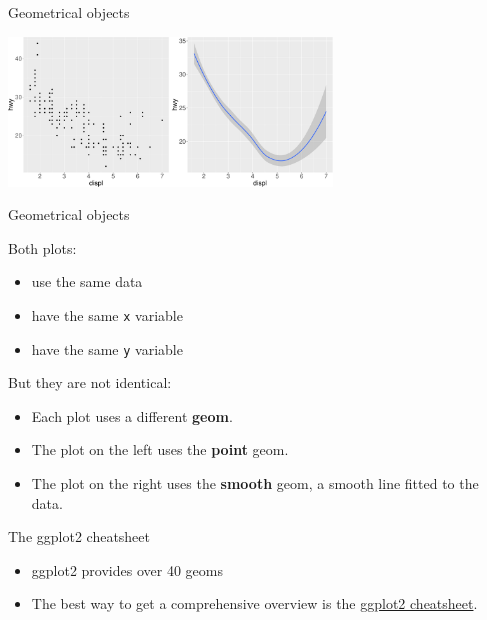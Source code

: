 \documentclass[ignorenonframetext,]{beamer}
\providecommand{\tightlist}{%
  \setlength{\itemsep}{0pt}\setlength{\parskip}{0pt}}
\begin{document}
\begin{frame}{Geometrical objects}
\protect\hypertarget{geometrical-objects-2}{}

\begin{center}\includegraphics[height=150px]{data-visualization_files/figure-beamer/unnamed-chunk-6-1} \end{center}

\end{frame}

\begin{frame}[fragile]{Geometrical objects}
\protect\hypertarget{geometrical-objects-3}{}

Both plots:

\begin{itemize}
\item
  use the same data
\item
  have the same \texttt{x} variable
\item
  have the same \texttt{y} variable
\end{itemize}

But they are not identical:

\begin{itemize}
\item
  Each plot uses a different \textbf{geom}.
\item
  The plot on the left uses the \textbf{point} geom.
\item
  The plot on the right uses the \textbf{smooth} geom, a smooth line
  fitted to the data.
\end{itemize}

\end{frame}

\begin{frame}{The ggplot2 cheatsheet}
\protect\hypertarget{the-ggplot2-cheatsheet}{}

\begin{itemize}
\tightlist
\item
  ggplot2 provides over 40 geoms
\item
  The best way to get a comprehensive overview is the
  \href{https://rstudio.com/wp-content/uploads/2016/11/ggplot2-cheatsheet-2.1.pdf}{ggplot2
  cheatsheet}.
\end{itemize}

\end{frame}
\end{document}
